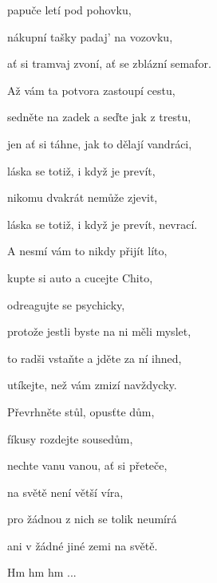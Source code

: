 papuče letí pod pohovku,

nákupní tašky padaj' na vozovku,

ať si tramvaj zvoní, ať se zblázní semafor.
\kr

\zs
Až vám ta potvora zastoupí cestu,

sedněte na zadek a seďte jak z trestu,

jen ať si táhne, jak to dělají vandráci,

láska se totiž, i když je prevít,

nikomu dvakrát nemůže zjevit,

láska se totiž, i když je prevít, nevrací.
\ks

\zs
A nesmí vám to nikdy přijít líto,

kupte si auto a cucejte Chito,

odreagujte se psychicky,

protože jestli byste na ni měli myslet,

to radši vstaňte a jděte za ní ihned,

utíkejte, než vám zmizí navždycky.
\ks

\zr
Převrhněte stůl, opusťte dům,

fíkusy rozdejte sousedům,

nechte vanu vanou, ať si přeteče,

na světě není větší víra,

pro žádnou z nich se tolik neumírá

ani v žádné jiné zemi na světě.
\kr

\zr
Hm hm hm ...
\kr

\kp





